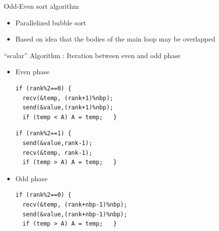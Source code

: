 \documentclass[compress,10pt,aspectratio=169]{beamer}
\begin{document}
\begin{frame}[fragile]{Odd-Even sort algorithm}
  \scriptsize
  \begin{itemize}
  \item Parallelized bubble sort
  \item Based on idea that the bodies of the main loop may be overlapped
  \end{itemize}

  \begin{exampleblock}{\small ``scalar'' Algorithm : Iteration between even and odd phase}
    \begin{itemize}
    \item Even phase\hspace*{2cm}  
      \begin{multicols}{2}
        \begin{tcolorbox}[boxsep=-1mm]
          \begin{verbatim}
if (rank%2==0) {
  recv(&temp, (rank+1)%nbp);
  send(&value,(rank+1)%nbp);
  if (temp < A) A = temp;   }
        \end{verbatim}
        \end{tcolorbox}
        
        \begin{tcolorbox}[boxsep=-1mm]
        \begin{verbatim}
if (rank%2==1) {
  send(&value,rank-1);
  recv(&temp, rank-1);
  if (temp > A) A = temp;   }
        \end{verbatim}
        \end{tcolorbox}
      \end{multicols}
    \item Odd phase\hspace*{2cm}  
      \begin{multicols}{2}
        \begin{tcolorbox}[boxsep=-1mm]
          \begin{verbatim}
if (rank%2==0) {
  recv(&temp, (rank+nbp-1)%nbp);
  send(&value,(rank+nbp-1)%nbp);
  if (temp > A) A = temp;   }
          \end{verbatim}
        \end{tcolorbox}


\end{multicols}
\end{itemize}
\end{exampleblock}
\end{frame}
\end{document}
